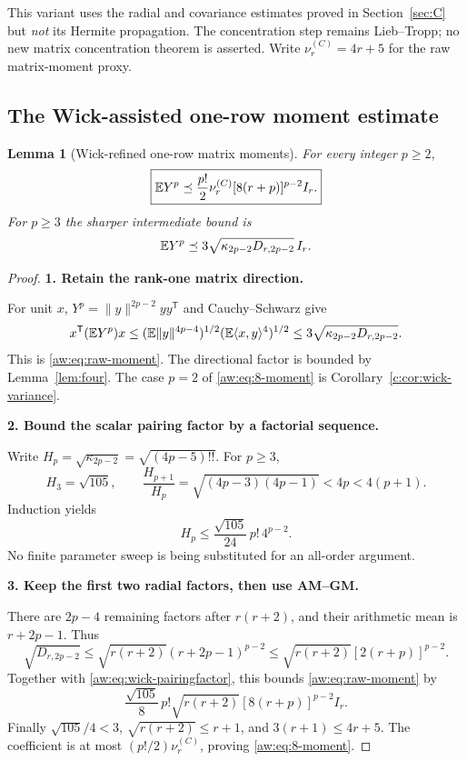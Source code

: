 \documentclass[11pt]{article}
\numberwithin{equation}{section}
\newtheorem{lemma}[theorem]{Lemma}
\theoremstyle{definition}\newtheorem{definition}[theorem]{Definition}
\theoremstyle{remark}\newtheorem{remark}[theorem]{Remark}
\newcommand{\norm}[1]{\lVert#1\rVert}\newcommand{\ip}[2]{\langle#1,#2\rangle}
\newcommand{\step}[1]{\par\addvspace{.65\baselineskip}\Needspace{4\baselineskip}\noindent\textbf{#1}\par\nobreak\smallskip}
\begin{document}
This variant uses the radial and covariance estimates proved in
Section~\ref{sec:C} but \emph{not} its Hermite propagation. The concentration
step remains Lieb--Tropp; no new matrix concentration theorem is asserted.
Write $\nu_r^{(C)}=4r+5$ for the raw matrix-moment proxy.

\subsection{The Wick-assisted one-row moment estimate}
\begin{lemma}[Wick-refined one-row matrix moments]\label{aw:lem:raw-moments}
For every integer $p\ge2$,
\begin{equation}\label{aw:eq:8-moment}
 \boxed{\mathbb E Y^p\preceq\frac{p!}{2}\nu_r^{(C)}[8(r+p)]^{p-2}I_r.}
\end{equation}
For $p\ge3$ the sharper intermediate bound is
\begin{equation}\label{aw:eq:raw-moment}
 \mathbb E Y^p\preceq3\sqrt{\kappa_{2p-2}D_{r,2p-2}}\,I_r.
\end{equation}
\end{lemma}
\begin{proof}
\step{1. Retain the rank-one matrix direction.}
For unit $x$, $Y^p=\norm y^{2p-2}yy^{\mathsf T}$ and Cauchy--Schwarz give
\[
 x^{\mathsf T}(\E Y^p)x
 \le(\E\norm y^{4p-4})^{1/2}(\E\ip{x}{y}^4)^{1/2}
 \le3\sqrt{\kappa_{2p-2}D_{r,2p-2}}.
\]
This is \eqref{aw:eq:raw-moment}. The directional factor is bounded by Lemma~\ref{lem:four}.
The case $p=2$ of \eqref{aw:eq:8-moment} is Corollary~\ref{c:cor:wick-variance}.

\step{2. Bound the scalar pairing factor by a factorial sequence.}
Write $H_p=\sqrt{\kappa_{2p-2}}=\sqrt{(4p-5)!!}$. For $p\ge3$,
\[
 H_3=\sqrt{105},\qquad
 \frac{H_{p+1}}{H_p}=\sqrt{(4p-3)(4p-1)}<4p<4(p+1).
\]
Induction yields
\begin{equation}\label{aw:eq:wick-pairingfactor}
 H_p\le\frac{\sqrt{105}}{24}\,p!\,4^{p-2}.
\end{equation}
No finite parameter sweep is being substituted for an all-order argument.

\step{3. Keep the first two radial factors, then use AM--GM.}
There are $2p-4$ remaining factors after $r(r+2)$, and their arithmetic mean is $r+2p-1$. Thus
\[
 \sqrt{D_{r,2p-2}}
 \le\sqrt{r(r+2)}(r+2p-1)^{p-2}
 \le\sqrt{r(r+2)}[2(r+p)]^{p-2}.
\]
Together with \eqref{aw:eq:wick-pairingfactor}, this bounds \eqref{aw:eq:raw-moment} by
\[
 \frac{\sqrt{105}}8\,p!\sqrt{r(r+2)}[8(r+p)]^{p-2}I_r.
\]
Finally $\sqrt{105}/4<3$, $\sqrt{r(r+2)}\le r+1$, and $3(r+1)\le4r+5$. The coefficient is at most $(p!/2)\nu_r^{(C)}$, proving \eqref{aw:eq:8-moment}.
\end{proof}
\end{document}
